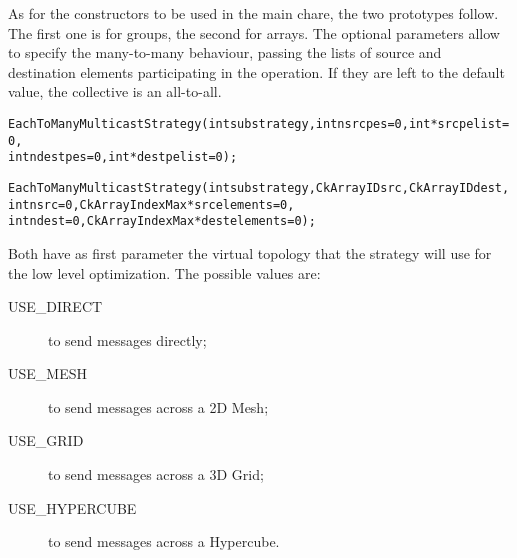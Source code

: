 {%



As for the constructors to be used in the main chare, the two prototypes follow.
The first one is for groups, the second for arrays. The optional parameters
allow to specify the many-to-many behaviour, passing the lists of source and
destination elements participating in the operation. If they are left to the
default value, the collective is an all-to-all.

\begin{alltt}
EachToManyMulticastStrategy(int substrategy, int nsrcpes=0, int *srcpelist=0,
                            int ndestpes=0, int *destpelist=0);

EachToManyMulticastStrategy(int substrategy, CkArrayID src, CkArrayID dest,
                            int nsrc=0, CkArrayIndexMax *srcelements=0,
                            int ndest=0, CkArrayIndexMax *destelements=0);
\end{alltt}

Both have as first parameter the virtual topology that the strategy will use for
the low level optimization. The possible values are:

\begin{description}
\item[USE\_DIRECT] to send messages directly;
\item[USE\_MESH] to send messages across a 2D Mesh;
\item[USE\_GRID] to send messages across a 3D Grid;
\item[USE\_HYPERCUBE] to send messages across a Hypercube.
\end{description}

}
